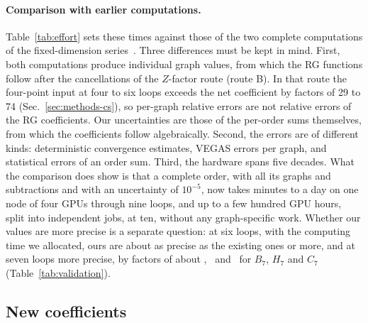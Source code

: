 \paragraph{Comparison with earlier computations.}
Table~\ref{tab:effort} sets these times against those of the two complete computations of the fixed-dimension
series~\cite{NMB1977,Phi4tools2024}. Three differences must be kept in mind. First, both computations produce individual graph values, from which the RG
functions follow after the cancellations of the $Z$-factor route (route B). In that route the four-point input at four to six loops
exceeds the net coefficient by factors of 29 to 74 (Sec.~\ref{sec:methods-cs}), so per-graph relative errors are not
relative errors of the RG coefficients. Our uncertainties are those of the per-order sums themselves, from which the
coefficients follow algebraically. Second, the errors are of different kinds: deterministic convergence estimates,
VEGAS errors per
graph, and statistical errors of an order sum. Third, the hardware spans five decades. What the comparison does show is
that a complete order, with all its graphs and subtractions and with an uncertainty of $10^{-5}$, now takes minutes
to a day on one node of four GPUs through nine loops, and up to a few hundred GPU hours, split into independent jobs,
at ten, without any graph-specific work. Whether our values are more precise is a
separate question: at six loops, with the computing time we allocated, ours are about as precise as the existing ones or
more, and at seven loops more precise, by factors of about \precBseven, \precHseven\ and \precCseven\ for $B_7$, $H_7$ and $C_7$ (Table~\ref{tab:validation}).

\subsection{New coefficients}
\label{sec:results-new}

